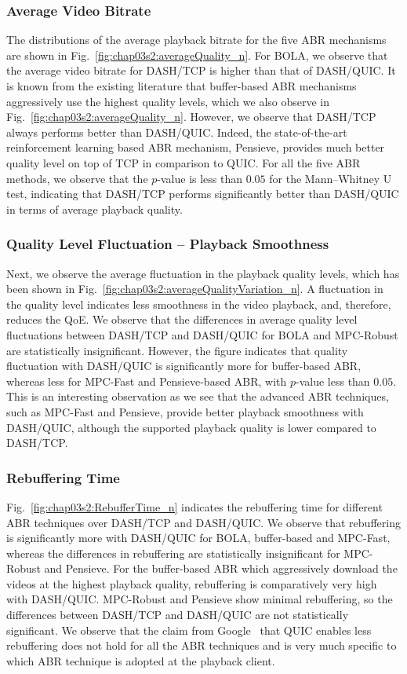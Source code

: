 \subsubsection{Average Video Bitrate}
The distributions of the average playback bitrate for the five ABR mechanisms are shown in Fig.~\ref{fig:chap03s2:averageQuality_n}. For BOLA, we observe that the average video bitrate for DASH/TCP is higher than that of DASH/QUIC. It is known from the existing literature that buffer-based ABR mechanisms aggressively use the highest quality levels, which we also observe in Fig.~\ref{fig:chap03s2:averageQuality_n}. However, we observe that DASH/TCP always performs better than DASH/QUIC. Indeed, the state-of-the-art reinforcement learning based ABR mechanism, Pensieve, provides much better quality level on top of TCP in comparison to QUIC. For all the five ABR methods, we observe that the $p$-value is less than $0.05$ for the Mann–Whitney U test, indicating that DASH/TCP performs significantly better than DASH/QUIC in terms of average playback quality.

\subsubsection{Quality Level Fluctuation -- Playback Smoothness}
Next, we observe the average fluctuation in the playback quality levels, which has been shown in Fig.~\ref{fig:chap03s2:averageQualityVariation_n}. A fluctuation in the quality level indicates less smoothness in the video playback, and, therefore, reduces the QoE. We observe that the differences in average quality level fluctuations between DASH/TCP and DASH/QUIC for BOLA and MPC-Robust are statistically insignificant. However, the figure indicates that quality fluctuation with DASH/QUIC is significantly more for buffer-based ABR, whereas less for MPC-Fast and Pensieve-based ABR, with $p$-value less than $0.05$. This is an interesting observation as we see that the advanced ABR techniques, such as MPC-Fast and Pensieve, provide better playback smoothness with DASH/QUIC, although the supported playback quality is lower compared to DASH/TCP. 


\subsubsection{Rebuffering Time}
Fig.~\ref{fig:chap03s2:RebufferTime_n} indicates the rebuffering time for different ABR techniques over DASH/TCP and DASH/QUIC. We observe that rebuffering is significantly more with DASH/QUIC for BOLA, buffer-based and MPC-Fast, whereas the differences in rebuffering are statistically insignificant for MPC-Robust and Pensieve. For the buffer-based ABR which aggressively download the videos at the highest playback quality, rebuffering is comparatively very high with DASH/QUIC. MPC-Robust and Pensieve show minimal rebuffering, so the differences between DASH/TCP and DASH/QUIC are not statistically significant. We observe that the claim from Google~\cite{langley2017quic} that QUIC enables less rebuffering does not hold for all the ABR techniques and is very much specific to which ABR technique is adopted at the playback client.  


